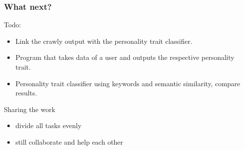 \documentclass{beamer}
\begin{document}
	\begin{frame}
		\frametitle{What next?}
		Todo:
		\begin{itemize}
			\item Link the crawly output with the personality trait classifier.
			\item Program that takes data of a user and outputs the respective personality trait.
			\item Personality trait classifier using keywords and semantic similarity, compare results.
		\end{itemize}
	
		Sharing the work
		\begin{itemize}
			\item divide all tasks evenly
			\item still collaborate and help each other
		\end{itemize}
	\end{frame}
	
\end{document}
